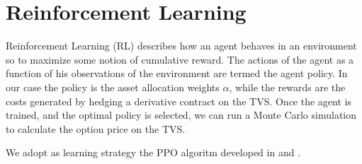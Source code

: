 \documentclass[11pt]{article}
\begin{document}
\section{Reinforcement Learning}\label{sec:RL}
 Reinforcement Learning (RL) describes how an agent behaves in an environment so to maximize some notion of cumulative reward. The actions of the agent as a function of his observations of the environment are termed the agent policy. In our case the policy is the asset allocation weights $\alpha$, while the rewards are the costs generated by hedging a derivative contract on the TVS. Once the agent is trained, and the optimal policy is selected, we can run a Monte Carlo simulation to calculate the option price on the TVS. 
 
 We adopt as learning strategy the PPO algoritm developed in \cite{ppo} and \cite{gae}. 
\cleardoublepage


\end{document}
